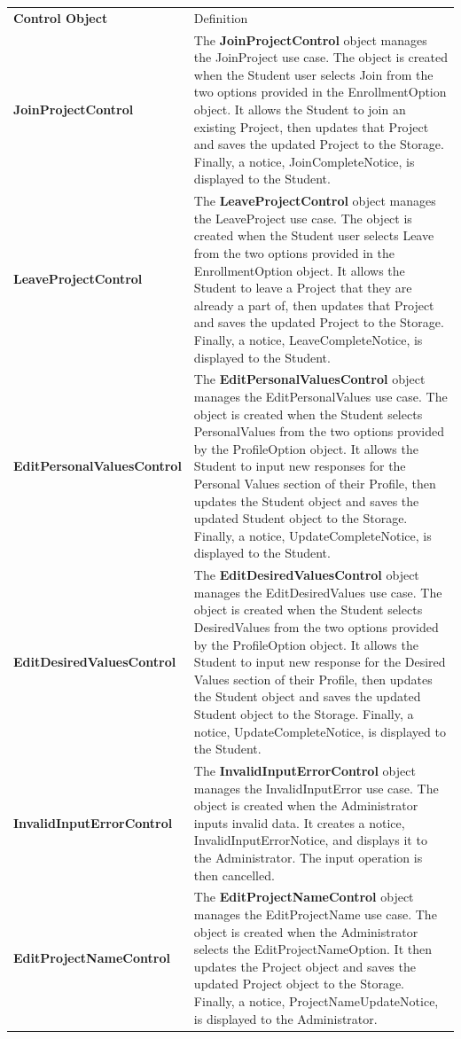 \documentclass[12pt,letterpaper]{article}
\begin{document}
\begin{center}
\begin{tabu} to 
		\tableheader{}Control Object & Definition\\
		JoinProjectControl & 
			The {\bf JoinProjectControl} object manages the JoinProject use case. The object is created when the Student user selects Join from the two options provided
			in the EnrollmentOption object. It allows the Student to join an existing Project, then updates that Project and saves the updated Project to the Storage. Finally, 
			a notice, JoinCompleteNotice, is displayed to the Student.\\
		LeaveProjectControl & 
			The {\bf LeaveProjectControl} object manages the LeaveProject use case. The object is created when the Student user selects Leave from the two options provided
			in the EnrollmentOption object. It allows the Student to leave a Project that they are already a part of, then updates that Project and saves the updated Project to
			the Storage. Finally, a notice, LeaveCompleteNotice, is displayed to the Student.\\
		EditPersonalValuesControl & 
			The {\bf EditPersonalValuesControl} object manages the EditPersonalValues use case. The object is created when the Student selects PersonalValues from the two
			options provided by the ProfileOption object. It allows the Student to input new responses for the Personal Values section of their Profile, then updates the Student
			object and saves the updated Student object to the Storage. Finally, a notice, UpdateCompleteNotice, is displayed to the Student.\\
		EditDesiredValuesControl & 
			The {\bf EditDesiredValuesControl} object manages the EditDesiredValues use case. The object is created when the Student selects DesiredValues from the two
			options provided by the ProfileOption object. It allows the Student to input new response for the Desired Values section of their Profile, then updates the Student
			object and saves the updated Student object to the Storage. Finally, a notice, UpdateCompleteNotice, is displayed to the Student. \\
		InvalidInputErrorControl & 
			The {\bf InvalidInputErrorControl} object manages the InvalidInputError use case. The object is created when the Administrator inputs invalid data. It creates a notice, 
			InvalidInputErrorNotice, and displays it to the Administrator. The input operation is then cancelled.\\
		EditProjectNameControl & 
			The {\bf EditProjectNameControl} object manages the EditProjectName use case. The object is created when the Administrator selects the EditProjectNameOption.
			It then updates the Project object and saves the updated Project object to the Storage. Finally, a notice, ProjectNameUpdateNotice, is displayed to the Administrator.\\
\end{tabu}
\end{center}
\end{document}
